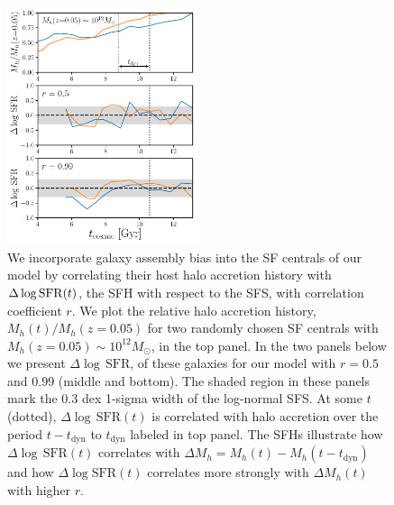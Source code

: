 \documentclass[12pt, letterpaper, preprint, tighten]{aastex62}
\newcommand{\edt}[1]{{\color{dred}{\bf} #1}}
\newcommand{\logsfr}{\log\mathrm{SFR}}
\begin{document}
\begin{figure}
\begin{center}
\includegraphics[width=0.5\textwidth]{figs/Mhacc_dSFR.pdf}
\caption{
    \edt{We incorporate galaxy assembly bias into the SF centrals of our model by
    correlating their host halo accretion history with $\Delta\log{\rm SFR}(t)$, 
    the SFH with respect to the SFS, with correlation coefficient $r$.} 
    We plot the relative halo accretion history, $M_h(t)/M_h(z{=}0.05)$
    for two randomly chosen SF centrals with $M_h(z{=}0.05)\sim10^{12}M_\odot$,
    in the top panel. In the two panels below we present $\Delta\log\,\mathrm{SFR}$,
    of these galaxies for our model with $r=0.5$ and $0.99$ (middle and bottom). 
    The shaded region in these panels mark the $0.3$ dex 1-sigma width of the 
    log-normal SFS. At some $t$ (dotted),
    $\Delta\log\,\mathrm{SFR}(t)$ is correlated with halo accretion over the
    period $t - t_\mathrm{dyn}$ to $t_\mathrm{dyn}$ labeled in top panel. The
    SFHs illustrate how $\Delta\log\,\mathrm{SFR}(t)$ correlates with
    $\Delta M_h = M_h(t) - M_h(t-t_\mathrm{dyn})$ and how $\Delta\logsfr(t)$
    correlates more strongly with $\Delta M_h(t)$ with higher $r$.}
\label{fig:mhacc_dsfr}
\end{center}
\end{figure}
\end{document}
